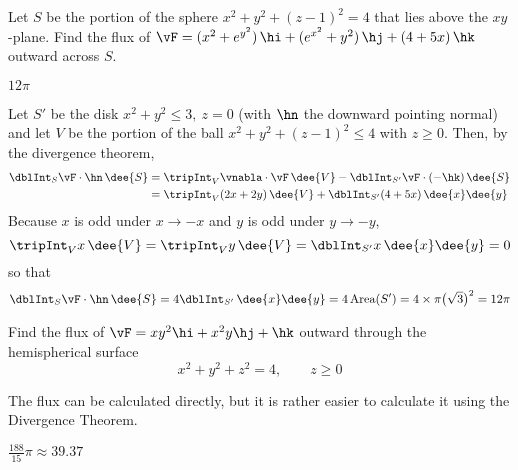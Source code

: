 \begin{question}[M317 2001A] %
Let $S$ be the portion of the sphere $x^2+y^2+(z-1)^2=4$
that lies above the $xy$-plane. Find the flux of 
$\vF=(x^2+e^{y^2})\,\hi+(e^{x^2}+y^2)\,\hj +(4+5x)\,\hk$ outward across
$S$.
\end{question}


\begin{answer} 
$12\pi$
\end{answer}

\begin{solution} 
Let $S'$ be the disk $x^2+y^2\le 3,\ z=0$ (with $\hn$ the downward 
pointing normal) and let $V$
be the portion of the ball $x^2+y^2+(z-1)^2\le 4$ with $z\ge 0$. 
Then, by the divergence theorem,
\begin{align*}
\dblInt_{S}\vF\cdot\hn\,\dee{S}
&=\tripInt_{V}\vnabla\cdot\vF\, \dee{V}
-\dblInt_{S'}\vF\cdot(-\hk)\,\dee{S}\\
&=\tripInt_{V}(2x+2y)\, \dee{V}
+\dblInt_{S'}(4+5x)\,\dee{x}\dee{y}
\end{align*}
Because $x$ is odd under $x\rightarrow-x$ and $y$ is odd under
$y\rightarrow -y$,
\begin{equation*}
\tripInt_{V}x\, \dee{V}=\tripInt_{V}y\, \dee{V}=\dblInt_{S'}x\,\dee{x}\dee{y}=0
\end{equation*}
so that
\begin{align*}
\dblInt_{S}\vF\cdot\hn\,\dee{S}
=4\dblInt_{S'}\,\dee{x}\dee{y}
=4\,\text{Area}(S')
=4\times \pi\big(\sqrt{3}\big)^2=12\pi 
\end{align*}

\end{solution}

\begin{question}[M317 1999A] %
Find the flux of $\vF=xy^2\hi+x^2y\hj+\hk$ outward through
the hemispherical surface 
\begin{equation*}
x^2+y^2+z^2=4,\qquad z\ge 0
\end{equation*}
\end{question}

\begin{hint} 
The flux can be calculated directly, but it is rather easier to 
calculate it using the Divergence Theorem.
\end{hint}

\begin{answer} 
$\frac{188}{15}\pi\approx39.37$
\end{answer}

